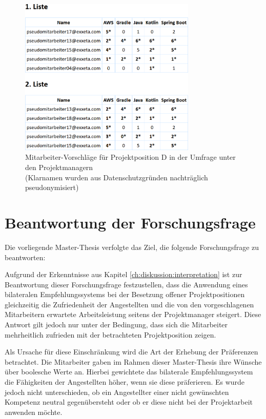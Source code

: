 \begin{figure}[h]
	\centering
	\includegraphics[width=0.75\textwidth]{gfx/projektposition-d.png}
	\caption{Mitarbeiter-Vorschläge für Projektposition D in der Umfrage unter den Projektmanagern\\
	(Klarnamen wurden aus Datenschutzgründen nachträglich pseudonymisiert)}
	\label{fig:diskussion:interpretation:abb2}
\end{figure}

\section{Beantwortung der Forschungsfrage}
\label{ch:diskussion:beantwortungForschungsfrage}
Die vorliegende Master-Thesis verfolgte das Ziel, die folgende Forschungsfrage zu beantworten: \forschungsfrage

Aufgrund der Erkenntnisse aus Kapitel \ref{ch:diskussion:interpretation} ist zur Beantwortung dieser Forschungsfrage festzustellen, dass die Anwendung eines bilateralen Empfehlungssystems bei der Besetzung offener Projektpositionen gleichzeitig die Zufriedenheit der Angestellten und die von den vorgeschlagenen Mitarbeitern erwartete Arbeitsleistung seitens der Projektmanager steigert. Diese Antwort gilt jedoch nur unter der Bedingung, dass sich die Mitarbeiter mehrheitlich zufrieden mit der betrachteten Projektposition zeigen.

Als Ursache für diese Einschränkung wird die Art der Erhebung der Präferenzen betrachtet. Die Mitarbeiter gaben im Rahmen dieser Master-Thesis ihre Wünsche über boolesche Werte an. Hierbei gewichtete das bilaterale Empfehlungssystem die Fähigkeiten der Angestellten höher, wenn sie diese präferieren. Es wurde jedoch nicht unterschieden, ob ein Angestellter einer nicht gewünschten Kompetenz neutral gegenübersteht oder ob er diese nicht bei der Projektarbeit anwenden möchte.

